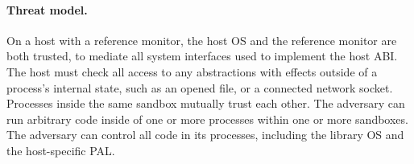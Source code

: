 \paragraph{Threat model.}
On a host with a reference monitor, the host OS and the reference monitor are both trusted, to mediate all system interfaces used to implement the host ABI. The host must check all access to any abstractions with effects outside of a process's internal state, such as an opened file, or a connected network socket.
Processes inside the same sandbox mutually trust each other. The adversary can run arbitrary code inside of one or more processes within one or more sandboxes.
The adversary can control all code in its processes, including the library OS and the host-specific PAL.





